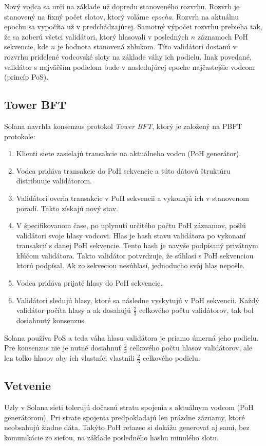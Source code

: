 Nový vodca sa určí na základe už dopredu stanoveného rozvrhu. Rozvrh je stanovený na fixný počet slotov, ktorý voláme \textit{epocha}. Rozvrh na aktuálnu epochu sa vypočíta už v predchádzajúcej. Samotný výpočet rozvrhu prebieha tak, že sa zoberú všetci validátori, ktorý hlasovali v posledných $n$ záznamoch PoH sekvencie, kde $n$ je hodnota stanovená zhlukom. Títo validátori dostanú v rozvrhu pridelené vodcovské sloty na základe váhy ich podielu. Inak povedané, validátor s najväčším podielom bude v nasledujúcej epoche najčastejšie vodcom (princíp PoS).

\subsection{Tower BFT}\label{subsec:towerbft}

Solana navrhla konsenzus protokol \textit{Tower BFT}, ktorý je založený na PBFT protokole:
\begin{enumerate}
	\item Klienti siete zasielajú transakcie na aktuálneho vodcu (PoH generátor).
	\item Vodca pridáva transakcie do PoH sekvencie a túto dátovú štruktúru distribuuje validátorom.
	\item Validátori overia transakcie v PoH sekvencii a vykonajú ich v stanovenom poradí. Takto získajú nový stav.
	\item V špecifikovanom čase, po uplynutí určitého počtu PoH záznamov, pošlú validátori svoje hlasy vodcovi. Hlas je hash stavu validátora po vykonaní transakcií s danej PoH sekvencie. Tento hash je navyše podpísaný privátnym kľúčom validátora. Takto validátor potvrdzuje, že súhlasí s PoH sekvenciou ktorú podpísal. Ak zo sekveciou nesúhlasí, jednoducho svôj hlas nepošle.
	\item Vodca pridáva prijaté hlasy do PoH sekvencie.
	\item Validátori sledujú hlasy, ktoré sa následne vyskytujú v PoH sekvencii. Každý validátor počíta hlasy a ak dosahujú $\frac{2}{3}$ celkového počtu validátorov, tak bol dosiahnutý konsenzus.
\end{enumerate}
Solana používa PoS a teda váha hlasu validátora je priamo úmerná jeho podielu. Pre konsenzus nie je nutné dosiahnuť $\frac{2}{3}$ celkového počtu hlasov validátorov, ale len toľko hlasov aby ich vlastníci vlastnili $\frac{2}{3}$ celkového podielu.

\subsection{Vetvenie}
Uzly v Solana sieti tolerujú dočasnú stratu spojenia s aktuálnym vodcom (PoH generátorom). Pri strate spojenia predpokladajú len prázdne záznamy, ktoré neobsahujú žiadne dáta. Takýto PoH reťazec si dokážu generovať aj sami, bez komunikácie zo sieťou, na základe posledného hashu minulého slotu.

